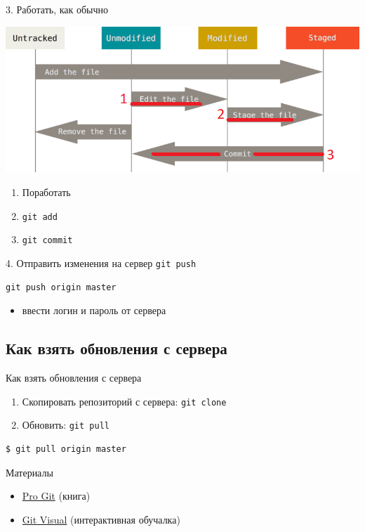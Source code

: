 \documentclass[presentation]{beamer}
\begin{document}
\begin{frame}[fragile,label={sec:org537b4ee}]{3. Работать, как обычно}
 \begin{center}
\includegraphics[height=0.5\textheight]{./01_vcs_01_git_file_states_02_change.png}
\end{center}

\begin{enumerate}
\item Поработать
\item \texttt{git add}
\item \texttt{git commit}
\end{enumerate}
\end{frame}

\begin{frame}[fragile,label={sec:org80552f7}]{4. Отправить изменения на сервер}
 \alert{\texttt{git push}}

\begin{verbatim}
git push origin master
\end{verbatim}

\begin{itemize}
\item ввести логин и пароль от \alert{сервера}
\end{itemize}
\end{frame}

\subsection{Как взять обновления с сервера}
\label{sec:orgefc9251}
\begin{frame}[fragile,label={sec:org1f0d292}]{Как взять обновления с сервера}
 \begin{enumerate}
\item Скопировать репозиторий с сервера: \texttt{git clone}
\item Обновить: \texttt{git pull}
\end{enumerate}

\begin{verbatim}
$ git pull origin master
\end{verbatim}
\end{frame}

\begin{frame}[label={sec:orgdefbc5e}]{Материалы}
\begin{itemize}
\item \href{https://git-scm.com/book/ru/v2}{Pro Git} (книга)
\item \href{http://gitvisual.com}{Git Visual} (интерактивная обучалка)
\end{itemize}
\end{frame}
\end{document}
